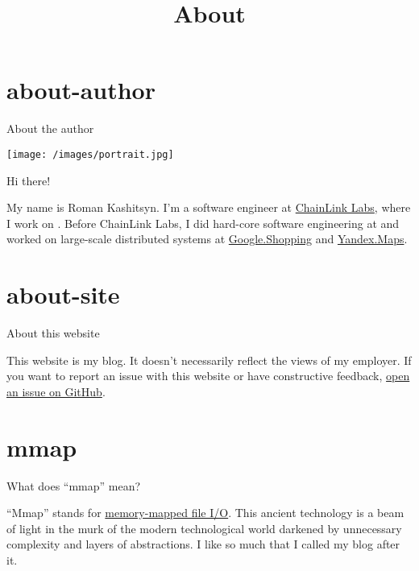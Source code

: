 \documentclass{article}
\title{About}
\begin{document}
\section{about-author}{About the author}

\texttt{[image: /images/portrait.jpg]}

Hi there!

My name is Roman Kashitsyn.
I'm a software engineer at \href{https://chainlinklabs.com/}{ChainLink Labs}, where I work on \href{https://chain.link/cross-chain}{}.
Before ChainLink Labs, I did hard-core software engineering at \href{https://dfinity.org}{} and worked on large-scale distributed systems at \href{https://shopping.google.com/}{Google.Shopping} and \href{https://yandex.ru/maps}{Yandex.Maps}.

\section{about-site}{About this website}

This website is my blog.
It doesn't necessarily reflect the views of my employer.
If you want to report an issue with this website or have constructive feedback, \href{https://github.com/roman-kashitsyn/mmapped.blog/issues/new}{open an issue on GitHub}.

\section{mmap}{What does ``mmap'' mean?}

``Mmap'' stands for \href{https://en.wikipedia.org/wiki/Mmap}{memory-mapped file I/O}.
This ancient technology is a beam of light in the murk of the modern technological world darkened by unnecessary complexity and layers of abstractions.
I like \href{https://www.man7.org/linux/man-pages/man2/mmap.2.html}{} so much that I called my blog after it.
\end{document}

